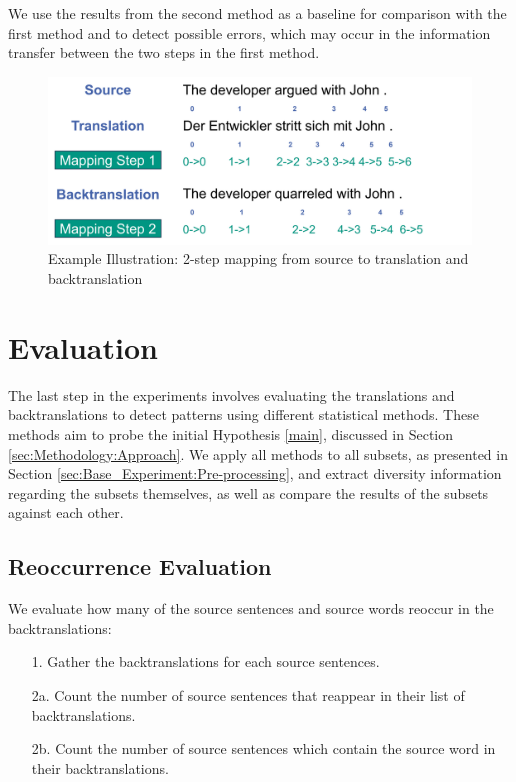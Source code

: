 We use the results from the second method as a baseline for comparison with the first method and to detect possible errors, which may occur in the information transfer between the two steps in the first method.

\begin{figure}[!htb]
  \centering
  \includegraphics[scale=0.5]{figures/alignment.png}
  \caption{Example Illustration: 2-step mapping from source to translation and backtranslation}
  \label{fig:alignment}
\end{figure}

\section{Evaluation}
\label{sec:Base_Experiment:Evaluation}

The last step in the experiments involves evaluating the translations and backtranslations to detect patterns using different statistical methods. These methods aim to probe the initial Hypothesis \ref{main}, discussed in Section \ref{sec:Methodology:Approach}. We apply all methods to all subsets, as presented in Section \ref{sec:Base_Experiment:Pre-processing}, and extract diversity information regarding the subsets themselves, as well as compare the results of the subsets against each other.


\subsection{Reoccurrence Evaluation}
\label{sec:Base_Experiment:Statistics:Reoccurrence}
We evaluate how many of the source sentences and source words reoccur in the backtranslations:

\begin{enumerate}
    \item[1. ] Gather the backtranslations for each source sentences.
    \item[2a. ] Count the number of source sentences that reappear in their list of backtranslations.
    \item[2b. ] Count the number of source sentences which contain the source word in their backtranslations.
\end{enumerate}

